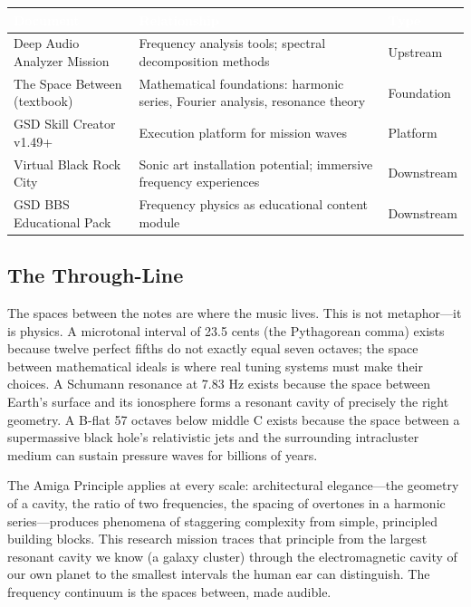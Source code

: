 \documentclass[11pt,letterpaper]{article}
\newcommand{\tableheader}[1]{\textbf{\sffamily\textcolor{white}{#1}}}
\begin{document}
\begin{center}
\begin{tabularx}{\textwidth}{L{4cm}XC{2.5cm}}
\toprule
{}
\tableheader{Document} & \tableheader{Relationship} & \tableheader{Type} \\
\midrule
Deep Audio Analyzer Mission & Frequency analysis tools; spectral decomposition methods & Upstream \\
The Space Between (textbook) & Mathematical foundations: harmonic series, Fourier analysis, resonance theory & Foundation \\
GSD Skill Creator v1.49+ & Execution platform for mission waves & Platform \\
Virtual Black Rock City & Sonic art installation potential; immersive frequency experiences & Downstream \\
GSD BBS Educational Pack & Frequency physics as educational content module & Downstream \\
\bottomrule
\end{tabularx}
\end{center}

\subsection{The Through-Line}

\begin{quotebox}
The spaces between the notes are where the music lives. This is not metaphor---it is physics. A microtonal interval of 23.5 cents (the Pythagorean comma) exists because twelve perfect fifths do not exactly equal seven octaves; the space between mathematical ideals is where real tuning systems must make their choices. A Schumann resonance at 7.83 Hz exists because the space between Earth's surface and its ionosphere forms a resonant cavity of precisely the right geometry. A B-flat 57 octaves below middle C exists because the space between a supermassive black hole's relativistic jets and the surrounding intracluster medium can sustain pressure waves for billions of years.

The Amiga Principle applies at every scale: architectural elegance---the geometry of a cavity, the ratio of two frequencies, the spacing of overtones in a harmonic series---produces phenomena of staggering complexity from simple, principled building blocks. This research mission traces that principle from the largest resonant cavity we know (a galaxy cluster) through the electromagnetic cavity of our own planet to the smallest intervals the human ear can distinguish. The frequency continuum is the spaces between, made audible.
\end{quotebox}
\end{document}
